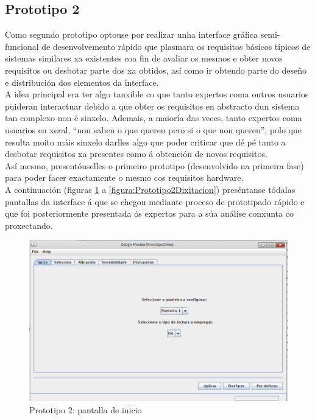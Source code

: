  \subsection{Prototipo 2}

 Como segundo prototipo optouse por realizar unha interface gráfica
 semi-funcional de desenvolvemento rápido que plasmara os requisitos básicos
 típicos de sistemas similares xa existentes coa fin de avaliar os mesmos e
 obter novos requisitos ou desbotar parte dos xa obtidos, así como ir obtendo
 parte do deseño e distribución dos elementos da interface. \\

 A idea principal era ter algo tanxible co que tanto expertos coma outros
 usuarios puideran interactuar debido a que obter os requisitos en abstracto
 dun sistema tan complexo non é sinxelo. Ademais, a maioría das veces, tanto
 expertos coma usuarios en xeral, “non saben o que queren pero si o que non
 queren”, polo que resulta moito máis sinxelo darlles algo que poder criticar
 que dé pé tanto a desbotar requisitos xa presentes como á obtención de novos
 requisitos. \\

 Así mesmo, presentóuselles o primeiro prototipo (desenvolvido na primeira
 fase) para poder facer exactamente o mesmo cos requisitos hardware. \\

 A continuación (figuras \ref{figura:Prototipo2Inicio} a
 \ref{figura:Prototipo2Dixitacion}) preséntanse tódalas pantallas da interface
 á que se chegou mediante proceso de prototipado rápido e que foi
 posteriormente presentada ós expertos para a súa análise conxunta co
 proxectando. \\

 \begin{figure}[htbp]
  \centering
  \includegraphics[scale=0.6,keepaspectratio=true]{./imagenes/prototipo2_01.png}
  \caption{Prototipo 2: pantalla de inicio}
  \label{figura:Prototipo2Inicio}
 \end{figure}

